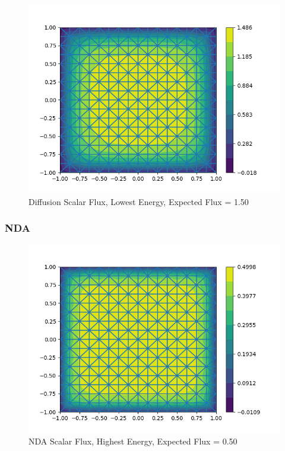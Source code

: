\begin{figure}[H]
    \centering
    \includegraphics[width=\textwidth]{fig/diff_multi_group1.png}
    \caption{Diffusion Scalar Flux, Lowest Energy, Expected Flux = 1.50}
    \label{fig:diff_multi_g2}
\end{figure}

\subsubsection{NDA}
\begin{figure}[H]
    \centering
    \includegraphics[width=\textwidth]{fig/nda_multi_group0.png}
    \caption{NDA Scalar Flux, Highest Energy, Expected Flux = 0.50}
    \label{fig:nda_multi_g1}
\end{figure}

